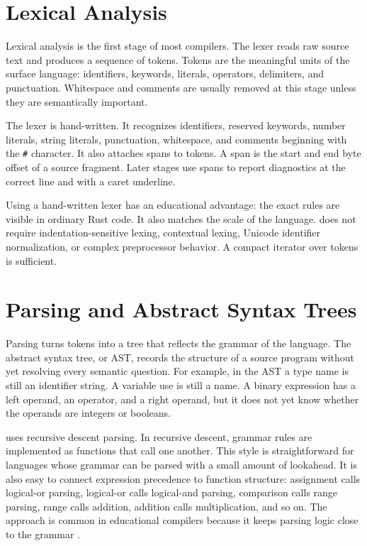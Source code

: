 \section{Lexical Analysis}

Lexical analysis is the first stage of most compilers. The lexer reads raw source
text and produces a sequence of tokens. Tokens are the meaningful units of the
surface language: identifiers, keywords, literals, operators, delimiters, and
punctuation. Whitespace and comments are usually removed at this stage unless
they are semantically important.

The \epl{} lexer is hand-written. It recognizes identifiers, reserved keywords,
number literals, string literals, punctuation, whitespace, and comments beginning
with the \texttt{\#} character. It also attaches spans to tokens. A span is the
start and end byte offset of a source fragment. Later stages use spans to report
diagnostics at the correct line and with a caret underline.

Using a hand-written lexer has an educational advantage: the exact rules are
visible in ordinary Rust code. It also matches the scale of the language. \epl{}
does not require indentation-sensitive lexing, contextual lexing, Unicode
identifier normalization, or complex preprocessor behavior. A compact iterator
over tokens is sufficient.

\section{Parsing and Abstract Syntax Trees}

Parsing turns tokens into a tree that reflects the grammar of the language. The
abstract syntax tree, or AST, records the structure of a source program without
yet resolving every semantic question. For example, in the AST a type name is
still an identifier string. A variable use is still a name. A binary expression
has a left operand, an operator, and a right operand, but it does not yet know
whether the operands are integers or booleans.

\epl{} uses recursive descent parsing. In recursive descent, grammar rules are
implemented as functions that call one another. This style is straightforward for
languages whose grammar can be parsed with a small amount of lookahead. It is
also easy to connect expression precedence to function structure: assignment
calls logical-or parsing, logical-or calls logical-and parsing, comparison calls
range parsing, range calls addition, addition calls multiplication, and so on.
The approach is common in educational compilers because it keeps parsing logic
close to the grammar \cite{nystrom2021crafting}.

